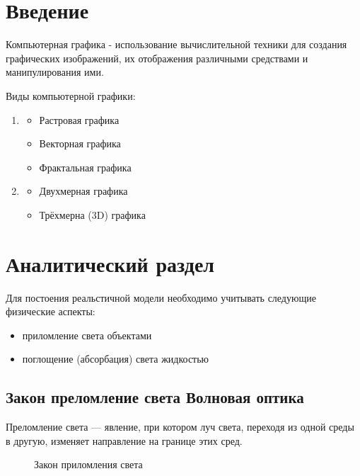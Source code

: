 \documentclass[12pt,a4paper,draft]{article}
\begin{document}
\def\contentaname{Содержание}
\tableofcontents %
\clearpage

\section{Введение}
    Компьютерная графика - использование вычислительной техники для создания графических изображений, их отображения различными средствами и манипулирования ими.

    Виды компьютерной графики:
    \begin{enumerate}
        \item
        \begin{itemize}
          \item{Растровая графика}
          \item{Векторная графика}
          \item{Фрактальная графика}
        \end{itemize}
        \item
        \begin{itemize}
          \item{Двухмерная графика}
          \item{Трёхмерна (3D) графика}
        \end{itemize}
    \end{enumerate}

\section{Аналитический раздел}
    Для постоения реальстичной модели необходимо учитывать следующие физические аспекты:
    \begin{itemize}
      \item приломление света объектами
      \item поглощение (абсорбация) света жидкостью
    \end{itemize}
    \subsection{Закон преломление света Волновая оптика}

    Преломление света — явление, при котором луч света, переходя из одной среды в другую, изменяет направление на границе этих сред.

    \begin{figure}[H]%
        \noindent{}
        \caption{Закон приломления света}
    \end{figure}
\end{document}
